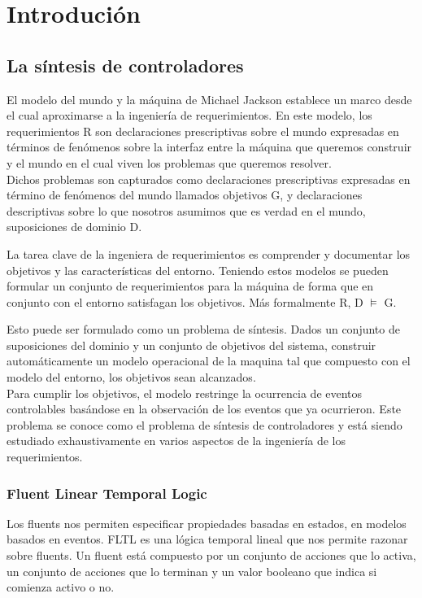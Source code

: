 \chapter{Introdución}

\section{La síntesis de controladores}

El modelo del mundo y la máquina de Michael Jackson establece un marco desde el cual aproximarse a la ingeniería de requerimientos. En este modelo, los requerimientos R son declaraciones prescriptivas sobre el mundo expresadas en términos de fenómenos sobre la interfaz entre la máquina que queremos construir y el mundo en el cual viven los problemas que queremos resolver.\\
Dichos problemas son capturados como declaraciones prescriptivas expresadas en término de fenómenos del mundo llamados objetivos G, y declaraciones descriptivas sobre lo que nosotros asumimos que es verdad en el mundo, suposiciones de dominio D.

\vspace{\baselineskip}
La tarea clave de la ingeniera de requerimientos es comprender y documentar los objetivos y las características del entorno. Teniendo estos modelos se pueden formular un conjunto de requerimientos para la máquina de forma que en conjunto con el entorno satisfagan los objetivos. Más formalmente R, D $\vDash$ G.

\vspace{\baselineskip}
Esto puede ser formulado como un problema de síntesis. Dados un conjunto de suposiciones del dominio y un conjunto de objetivos del sistema, construir  automáticamente un modelo operacional de la maquina tal que compuesto con el modelo del entorno, los objetivos sean alcanzados.\\
Para cumplir los objetivos, el modelo restringe la ocurrencia de eventos controlables basándose en la observación de los eventos que ya ocurrieron.
Este problema se conoce como el problema de síntesis de controladores y está siendo estudiado exhaustivamente en varios aspectos de la ingeniería de los requerimientos.

\subsection{Fluent Linear Temporal Logic}
Los fluents nos permiten especificar propiedades basadas en estados, en modelos basados en eventos. FLTL es una lógica temporal lineal que nos permite razonar sobre fluents. Un fluent está compuesto por un conjunto de acciones  que lo activa, un conjunto de acciones que lo terminan y un valor booleano que indica si comienza activo o no.

